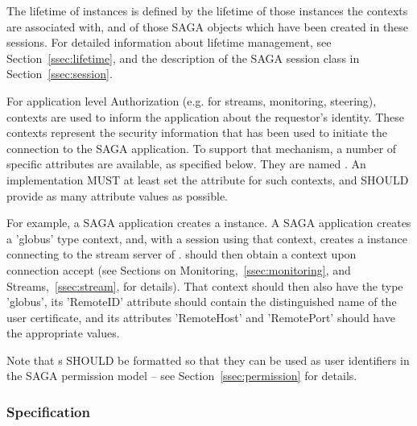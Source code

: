   The lifetime of  instances is
  defined by the lifetime of those  instances
  the contexts are associated with, and of those SAGA objects
  which have been created in these sessions.  For detailed
  information about lifetime management, see 
  Section~\ref{ssec:lifetime}, and the description of
  the SAGA session class in Section~\ref{ssec:session}.
 
  For application level Authorization (e.g. for
  streams, monitoring, steering),  contexts are
  used to inform the application about the requestor's
  identity.  These contexts represent the security
  information that has been used to initiate the connection to
  the SAGA application.  To support that mechanism, a number of specific
  attributes are available, as specified below.  They are named
  .  An implementation MUST at
  least set the  attribute for such contexts, and SHOULD
  provide as many attribute values as possible.
 
  For example, a SAGA application  creates a
   instance.  A SAGA application 
  creates a 'globus' type context, and, with a session using
  that context, creates a  instance connecting
  to the stream server of .   should then obtain a
  context upon connection accept (see Sections on
  Monitoring,~\ref{ssec:monitoring}, and
  Streams,~\ref{ssec:stream}, for details).  That context should
  then also have the type 'globus', its 'RemoteID' attribute
  should contain the distinguished name of the user  certificate,
  and its attributes 'RemoteHost' and 'RemotePort' should have
  the appropriate values.
 
  Note that s SHOULD be formatted so that they
  can be used as user identifiers in the SAGA permission model
  -- see Section~\ref{ssec:permission} for details.
 
 
 \subsubsection{Specification}
 
